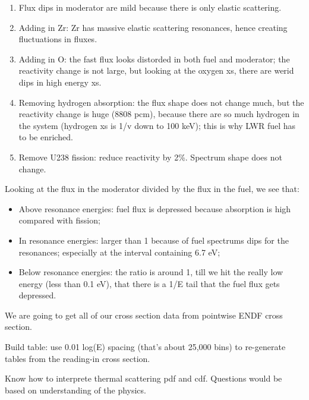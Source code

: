 \documentclass{school-22.211-notes}
\date{March  7, 2012}
\begin{document}
\maketitle





\begin{enumerate}
\item Flux dips in moderator are mild because there is only elastic scattering. 
\item Adding in Zr: Zr has massive elastic scattering resonances, hence creating fluctuations in fluxes. 
\item Adding in O: the fast flux looks distorded in both fuel and moderator; the reactivity change is not large, but looking at the oxygen xs, there are werid dips in high energy xs. 
\item Removing hydrogen absorption: the flux shape does not change much, but the reactivity change is huge (8808 pcm), because there are so much hydrogen in the system (hydrogen xs is 1/v down to 100 keV); this is why LWR fuel has to be enriched. 
\item Remove U238 fission: reduce reactivity by 2\%. Spectrum shape does not change. 
\end{enumerate}
Looking at the flux in the moderator divided by the flux in the fuel, we see that:
\begin{itemize}
\item Above resonance energies: fuel flux is depressed because absorption is high compared with fission; 
\item In resonance energies: larger than 1 because of fuel spectrums dips for the resonances; especially at the interval containing 6.7 eV;
\item Below resonance energies: the ratio is around 1, till we hit the really low energy (less than 0.1 eV), that there is a 1/E tail that the fuel flux gets depressed. 
\end{itemize}

We are going to get all of our cross section data from pointwise ENDF cross section. 

Build table: use 0.01 log(E) spacing (that's about 25,000 bins) to re-generate tables from the reading-in cross section. 


Know how to interprete thermal scattering pdf and cdf. Questions would be based on understanding of the physics. 
\end{document}
